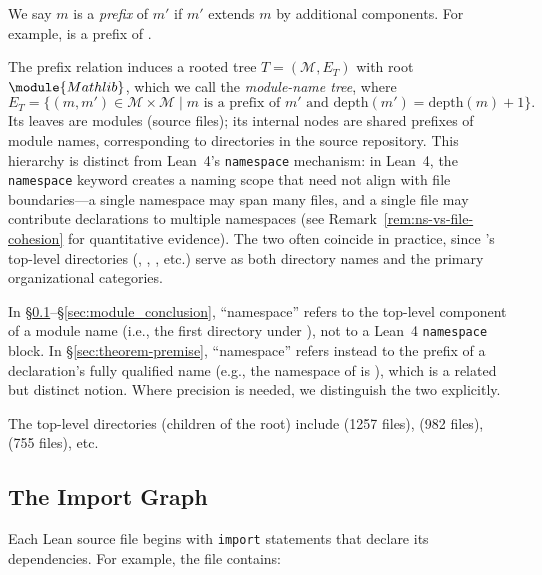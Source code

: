 We say $m$ is a \emph{prefix} of $m'$ if $m'$ extends $m$ by additional components. For example,  is a prefix of .

The prefix relation induces a rooted tree $T = (\mathcal{M}, E_T)$ with root $\module{Mathlib}$, which we call the \emph{module-name tree}, where
\[
  E_T = \{(m, m') \in \mathcal{M} \times \mathcal{M} \mid m \text{ is a prefix of } m' \text{ and } \mathrm{depth}(m') = \mathrm{depth}(m) + 1\}.
\]
Its leaves are modules (source files); its internal nodes are shared prefixes of module names, corresponding to directories in the source repository. This hierarchy is distinct from Lean~4's \texttt{namespace} mechanism: in Lean~4, the \texttt{namespace} keyword creates a naming scope that need not align with file boundaries---a single namespace may span many files, and a single file may contribute declarations to multiple namespaces (see Remark~\ref{rem:ns-vs-file-cohesion} for quantitative evidence). The two often coincide in practice, since 's top-level directories (, , , etc.) serve as both directory names and the primary organizational categories.

\begin{remark}
\label{rem:ns-terminology}
In \S\ref{sec:import-graph}--\S\ref{sec:module_conclusion}, ``namespace'' refers to the top-level component of a module name (i.e., the first directory under ), not to a Lean~4 \texttt{namespace} block. In \S\ref{sec:theorem-premise}, ``namespace'' refers instead to the prefix of a declaration's fully qualified name (e.g., the namespace of  is ), which is a related but distinct notion. Where precision is needed, we distinguish the two explicitly.
\end{remark}

The top-level directories (children of the root) include  (1257 files),  (982 files),  (755 files), etc.

\subsection{The Import Graph}
\label{sec:import-graph}

Each Lean source file begins with \texttt{import} statements that declare its dependencies. For example, the file  contains:

